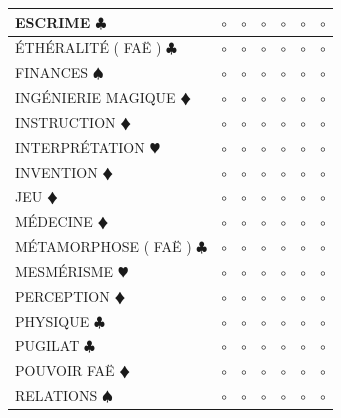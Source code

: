 \documentclass[a5paper,french]{article}
\begin{document}
\begin{tabular}[c]{|p{}|p{}|p{}|p{}|p{}|p{}|p{}|}
	ESCRIME { $\clubsuit$ }								&	$\circ$	&	$\circ$	&	$\circ$	&	$\circ$	&	$\circ$		&	$\circ$		\\ \hline
	ÉTHÉRALITÉ ( FAË ) { $\clubsuit$ }					&	$\circ$	&	$\circ$	&	$\circ$	&	$\circ$	&	$\circ$		&	$\circ$		\\ \hline
	FINANCES { $\spadesuit$ }							&	$\circ$	&	$\circ$	&	$\circ$	&	$\circ$	&	$\circ$		&	$\circ$		\\ \hline
	INGÉNIERIE MAGIQUE {\color{red} $\vardiamond$ }		&	$\circ$	&	$\circ$	&	$\circ$	&	$\circ$	&	$\circ$		&	$\circ$		\\ \hline
	INSTRUCTION {\color{red} $\vardiamond$ }			&	$\circ$	&	$\circ$	&	$\circ$	&	$\circ$	&	$\circ$		&	$\circ$		\\ \hline
	INTERPRÉTATION {\color{red} $\varheart$ }			&	$\circ$	&	$\circ$	&	$\circ$	&	$\circ$	&	$\circ$		&	$\circ$		\\ \hline
	INVENTION {\color{red} $\vardiamond$ }				&	$\circ$	&	$\circ$	&	$\circ$	&	$\circ$	&	$\circ$		&	$\circ$		\\ \hline
	JEU {\color{red} $\vardiamond$ }					&	$\circ$	&	$\circ$	&	$\circ$	&	$\circ$	&	$\circ$		&	$\circ$		\\ \hline
	MÉDECINE {\color{red} $\vardiamond$ }				&	$\circ$	&	$\circ$	&	$\circ$	&	$\circ$	&	$\circ$		&	$\circ$		\\ \hline
	MÉTAMORPHOSE ( FAË ) { $\clubsuit$ }				&	$\circ$	&	$\circ$	&	$\circ$	&	$\circ$	&	$\circ$		&	$\circ$		\\ \hline
	MESMÉRISME {\color{red} $\varheart$ }				&	$\circ$	&	$\circ$	&	$\circ$	&	$\circ$	&	$\circ$		&	$\circ$		\\ \hline
	PERCEPTION {\color{red} $\vardiamond$ }				&	$\circ$	&	$\circ$	&	$\circ$	&	$\circ$	&	$\circ$		&	$\circ$		\\ \hline
	PHYSIQUE { $\clubsuit$ }							&	$\circ$	&	$\circ$	&	$\circ$	&	$\circ$	&	$\circ$		&	$\circ$		\\ \hline
	PUGILAT { $\clubsuit$ }								&	$\circ$	&	$\circ$	&	$\circ$	&	$\circ$	&	$\circ$		&	$\circ$		\\ \hline
	POUVOIR FAË {\color{red} $\vardiamond$ }			&	$\circ$	&	$\circ$	&	$\circ$	&	$\circ$	&	$\circ$		&	$\circ$		\\ \hline
	RELATIONS { $\spadesuit$ }							&	$\circ$	&	$\circ$	&	$\circ$	&	$\circ$	&	$\circ$		&	$\circ$		\\ \hline

\end{tabular}
\end{document}
